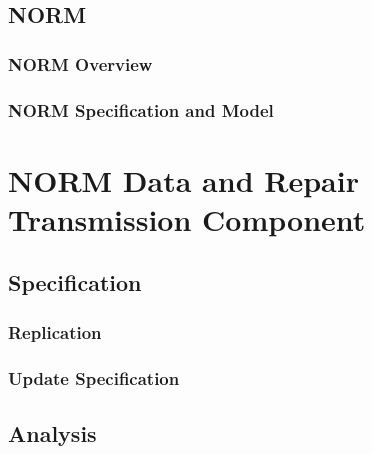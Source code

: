 \documentclass[10pt, journal]{IEEEtran}
\begin{document}
\subsection{NORM}

\subsubsection{NORM Overview}

\subsubsection{NORM Specification and Model}

\section{NORM Data and Repair Transmission Component}

\subsection{Specification}

\subsubsection{Replication}

\subsubsection{Update Specification}

\subsection{Analysis}



\end{document}
